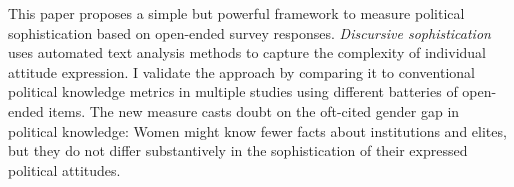 This paper proposes a simple but powerful framework to measure political sophistication based on open-ended survey responses. \textit{Discursive sophistication} uses automated text analysis methods to capture the complexity of individual attitude expression. I validate the approach by comparing it to conventional political knowledge metrics in multiple studies using different batteries of open-ended items. The new measure casts doubt on the oft-cited gender gap in political knowledge: Women might know fewer facts about institutions and elites, but they do not differ substantively in the sophistication of their expressed political attitudes.